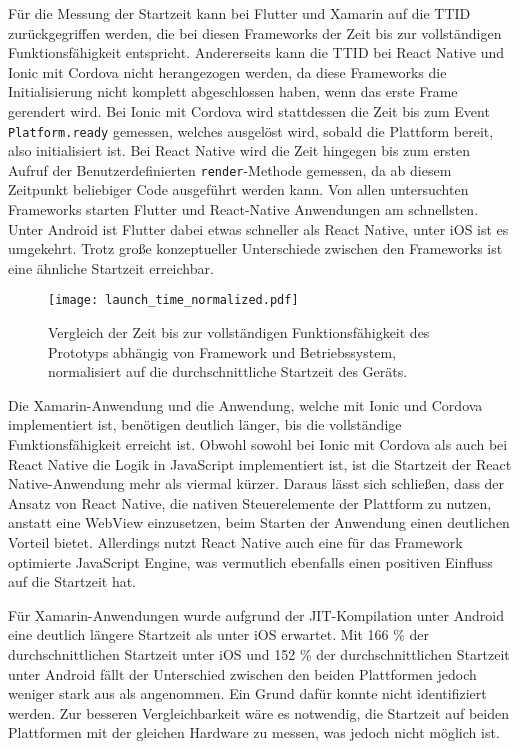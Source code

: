 Für die Messung der Startzeit kann bei Flutter und Xamarin auf die \ac{TTID} zurückgegriffen werden, die bei diesen Frameworks der Zeit bis zur vollständigen Funktionsfähigkeit entspricht.
Andererseits kann die \ac{TTID} bei React Native und Ionic mit Cordova nicht herangezogen werden, da diese Frameworks die Initialisierung nicht komplett abgeschlossen haben, wenn das erste Frame gerendert wird.
Bei Ionic mit Cordova wird stattdessen die Zeit bis zum Event \texttt{Platform.ready} gemessen, welches ausgelöst wird, sobald die Plattform bereit, also initialisiert ist.
Bei React Native wird die Zeit hingegen bis zum ersten Aufruf der Benutzerdefinierten \texttt{render}-Methode gemessen, da ab diesem Zeitpunkt beliebiger Code ausgeführt werden kann.
Von allen untersuchten Frameworks starten Flutter und React-Native Anwendungen am schnellsten.
Unter Android ist Flutter dabei etwas schneller als React Native, unter iOS ist es umgekehrt.
Trotz große konzeptueller Unterschiede zwischen den Frameworks ist eine ähnliche Startzeit erreichbar.

\begin{figure}[ht]
  \centering 
  \texttt{[image: launch\_time\_normalized.pdf]}
  \caption{Vergleich der Zeit bis zur vollständigen Funktionsfähigkeit des Prototyps abhängig von Framework und Betriebssystem, normalisiert auf die durchschnittliche Startzeit des Geräts.}
  \label{fig:launch_time_normalized}
\end{figure}
Die Xamarin-Anwendung und die Anwendung, welche mit Ionic und Cordova implementiert ist, benötigen deutlich länger, bis die vollständige Funktionsfähigkeit erreicht ist.
Obwohl sowohl bei Ionic mit Cordova als auch bei React Native die Logik in JavaScript implementiert ist, ist die Startzeit der React Native-Anwendung mehr als viermal kürzer.
Daraus lässt sich schließen, dass der Ansatz von React Native, die nativen Steuerelemente der Plattform zu nutzen, anstatt eine WebView einzusetzen, beim Starten der Anwendung einen deutlichen Vorteil bietet.
Allerdings nutzt React Native auch eine für das Framework optimierte JavaScript Engine, was vermutlich ebenfalls einen positiven Einfluss auf die Startzeit hat.

Für Xamarin-Anwendungen wurde aufgrund der \ac{JIT}-Kompilation unter Android eine deutlich längere Startzeit als unter iOS erwartet.
Mit 166 \% der durchschnittlichen Startzeit unter iOS und 152 \% der durchschnittlichen Startzeit unter Android fällt der Unterschied zwischen den beiden Plattformen jedoch weniger stark aus als angenommen.
Ein Grund dafür konnte nicht identifiziert werden.
Zur besseren Vergleichbarkeit wäre es notwendig, die Startzeit auf beiden Plattformen mit der gleichen Hardware zu messen, was jedoch nicht möglich ist.

